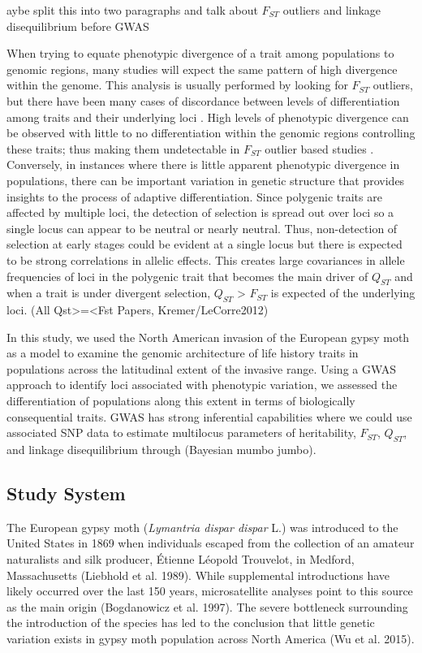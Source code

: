 \documentclass[smallextended]{svjour3}
\begin{document}
^^Maybe split this into two paragraphs and talk about $F_{ST}$ outliers and
linkage
disequilibrium before GWAS

When trying to equate phenotypic divergence of a trait among populations to
genomic regions, many studies will expect the same pattern of high divergence
within the genome. This analysis is usually performed by looking for $F_{ST}$
outliers, but there have been many cases of discordance between levels of
differentiation among traits and their underlying loci \citep{McKay:2002ek}. 
High
levels of phenotypic divergence can be observed with little to no
differentiation within the genomic regions controlling these traits; thus
making
them undetectable in $F_{ST}$ outlier based studies \citep{LeCorre:2003vi}.
Conversely, in instances where there is little apparent phenotypic divergence
in
populations, there can be important variation in genetic structure that
provides
insights to the process of adaptive differentiation. Since polygenic traits are
affected by multiple loci, the detection of selection is spread out over loci
so
a single locus can appear to be neutral or nearly neutral. Thus, non-detection
of selection at early stages could be evident at a single locus but there is
expected to be strong correlations in allelic effects. This creates large
covariances in allele frequencies of loci in the polygenic trait that becomes
the main driver of $Q_{ST}$ and when a trait is under divergent selection,
$Q_{ST}$
>
$F_{ST}$
is expected of the underlying loci. (All Qst>=<Fst Papers,
Kremer/LeCorre2012)

In this study, we used the North American invasion of the European gypsy moth
as
a model to examine the genomic architecture of life history traits in
populations across the latitudinal extent of the invasive range.  Using a GWAS
approach to identify loci associated with phenotypic variation, we assessed the
differentiation of populations along this extent in terms of biologically
consequential traits. GWAS has strong inferential capabilities where we could
use associated SNP data to estimate multilocus parameters of heritability,
$F_{ST}$,
$Q_{ST}$, and linkage disequilibrium through (Bayesian mumbo jumbo).

\subsection*{Study System}

The European gypsy moth (\textit{Lymantria dispar dispar} L.) was introduced to
the United States in 1869 when individuals escaped from the collection of an
amateur naturalists and silk producer, Étienne Léopold Trouvelot, in Medford,
Massachusetts (Liebhold et al. 1989). While supplemental introductions have
likely occurred over the last 150 years, microsatellite analyses point to this
source as the main origin (Bogdanowicz et al. 1997). The severe bottleneck
surrounding the introduction of the species has led to the conclusion that
little genetic variation exists in gypsy moth population across North America
(Wu et al. 2015).
\end{document}

